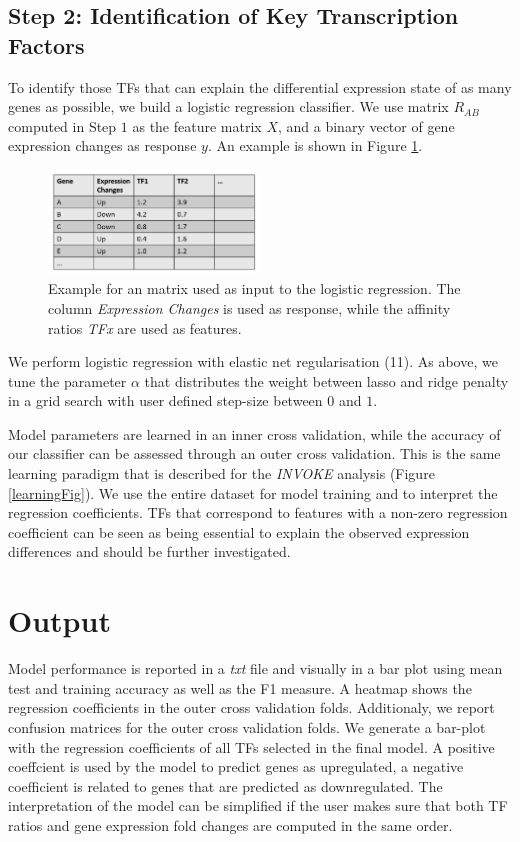 \documentclass{article}
\begin{document}
\subsection{Step 2: Identification of Key Transcription Factors}
To identify those TFs that can explain the differential expression state of as many genes as possible, we build a logistic regression classifier. 
We use matrix $R_{AB}$ computed in Step $1$ as the feature matrix $X$, and a binary vector of gene expression changes as response $y$. 
An example is shown in Figure \ref{Log-Reg-Example}.
\begin{figure}[h!]
\centering
\includegraphics[width=0.5\textwidth]{Example_Matrix.png}
\caption{Example for an matrix used as input to the logistic regression. The column \textit{Expression Changes} is used as response, while the affinity ratios \textit{TFx} are used as features.}
\label{Log-Reg-Example}
\end{figure}
We perform logistic regression with elastic net regularisation (11).
As above, we tune the parameter $\alpha$ that distributes the weight between lasso and ridge penalty in a grid search with user defined step-size between $0$ and $1$.

Model parameters are learned in an inner cross validation, while the accuracy of our classifier can be assessed through an outer cross validation. This is the
same learning paradigm that is described for the \textit{INVOKE} analysis (Figure \ref{learningFig}). We use the entire dataset for model training and to interpret the regression coefficients.
TFs that correspond to features with a non-zero regression coefficient can be seen as being essential to explain the observed expression differences and should be further investigated.

\section{Output}
Model performance is reported in a \textit{txt} file and visually in a bar plot using mean test and training accuracy as well as the F1 measure.
A heatmap shows the regression coefficients in the outer cross validation folds. 
Additionaly, we report confusion matrices for the outer cross validation folds.
We generate a bar-plot with the regression coefficients of all TFs selected in the final model.
A positive coeffcient is used by the model to predict genes as upregulated, a negative coefficient is related to genes that are predicted as downregulated. The interpretation
of the model can be simplified if the user makes sure that both TF ratios and gene expression fold changes are computed in the same order. 
\end{document}

